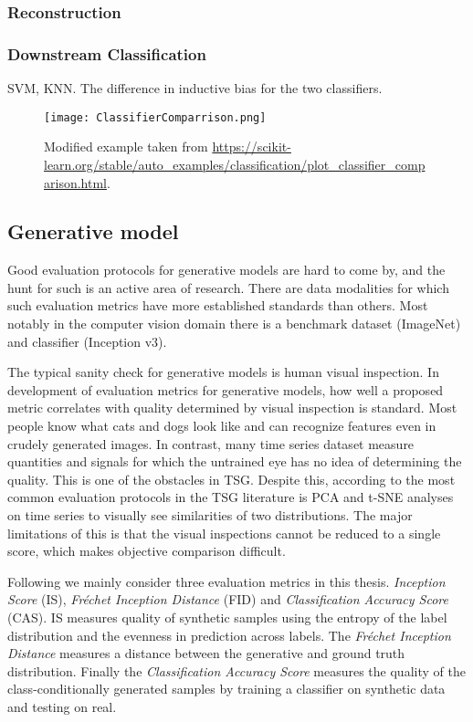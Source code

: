 \documentclass[../../thesis.tex]{subfiles}
\begin{document}
\subsubsection{Reconstruction}


\subsubsection{Downstream Classification}

SVM, KNN. The difference in inductive bias for the two classifiers. 


\begin{figure}[h]
    \label{fig:ClassifierComparrison}
    \texttt{[image: ClassifierComparrison.png]}
    \centering
    \caption{Modified example taken from \url{https://scikit-learn.org/stable/auto_examples/classification/plot_classifier_comparison.html}.}
\end{figure}

\subsection{Generative model}
Good evaluation protocols for generative models are hard to come by, and the hunt for such is an active area of research. There are data modalities for which such evaluation metrics have more established standards than others. Most notably in the computer vision domain there is a benchmark dataset (ImageNet) and classifier (Inception v3). \newline

The typical sanity check for generative models is human visual inspection. In development of evaluation metrics for generative models, how well a proposed metric correlates with quality determined by visual inspection is standard. Most people know what cats and dogs look like and can recognize features even in crudely generated images. In contrast, many time series dataset measure quantities and signals for which the untrained eye has no idea of determining the quality. This is one of the obstacles in TSG. Despite this, according to \cite{TimeVQVAE} the most common evaluation protocols in the TSG literature is PCA and t-SNE analyses on time series to visually see similarities of two distributions. The major limitations of this is that the visual inspections cannot be reduced to a single score, which makes objective comparison difficult. \newline

Following \cite{TimeVQVAE} we mainly consider three evaluation metrics in this thesis. \textit{Inception Score} (IS), \textit{Fréchet Inception Distance} (FID) and \textit{Classification Accuracy Score} (CAS). IS measures quality of synthetic samples using the entropy of the label distribution and the evenness in prediction across labels. The \textit{Fréchet Inception Distance} measures a distance between the generative and ground truth distribution. Finally the \textit{Classification Accuracy Score} measures the quality of the class-conditionally generated samples by training a classifier on synthetic data and testing on real.
\end{document}
